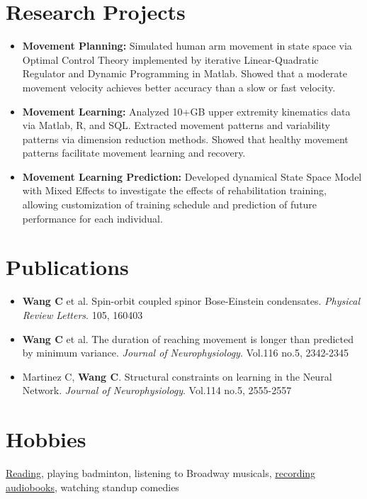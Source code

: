 \documentclass[hidelinks,letterpaper,12pt]{article}
\newcommand{\resumeItem}[2]{
  \item{
    \textbf{#1: }{\small #2 \vspace{-2pt}}
  }
}
\newcommand{\resumeSubHeadingListStart}{\begin{itemize}[leftmargin=*]}
\newcommand{\resumeSubHeadingListEnd}{\end{itemize}}
\begin{document}
\section{Research Projects}
  \resumeSubHeadingListStart 
    \resumeItem{Movement Planning}
      {Simulated human arm movement in state space via Optimal Control Theory implemented by iterative Linear-Quadratic Regulator and {Dynamic Programming} in Matlab. Showed that a moderate movement velocity achieves better accuracy than a slow or fast velocity.}
    \resumeItem{Movement Learning}
      {Analyzed 10+GB upper extremity kinematics data via Matlab, R, and SQL. Extracted movement patterns and variability patterns via dimension reduction methods. Showed that healthy movement patterns facilitate movement learning and recovery. }
    \resumeItem{Movement Learning Prediction}
      {Developed dynamical {State Space Model with Mixed Effects} to investigate the effects of rehabilitation training, allowing customization of training schedule and prediction of future performance for each individual.}
  \resumeSubHeadingListEnd


\section{Publications}
  \resumeSubHeadingListStart
    \item \small{\textbf{Wang C} et al. Spin-orbit coupled spinor Bose-Einstein condensates. \emph{Physical Review Letters}. 105, 160403}
    \item \small{\textbf{Wang C} et al. The duration of reaching movement is longer than predicted by minimum variance. \emph{Journal of Neurophysiology}. Vol.116 no.5, 2342-2345}
    \item \small{Martinez C, \textbf{Wang C}. Structural constraints on learning in the Neural Network. \emph{Journal of Neurophysiology}. Vol.114 no.5, 2555-2557}
  \resumeSubHeadingListEnd



\section{Hobbies}
\small{\href{https://www.goodreads.com/user/show/45921938-chunji-wang}{\textsf{Reading}}, playing badminton, listening to Broadway musicals, \href{http://www.ximalaya.com/10093874/profile}{\textsf{recording audiobooks}}, watching standup comedies}



\end{document}
